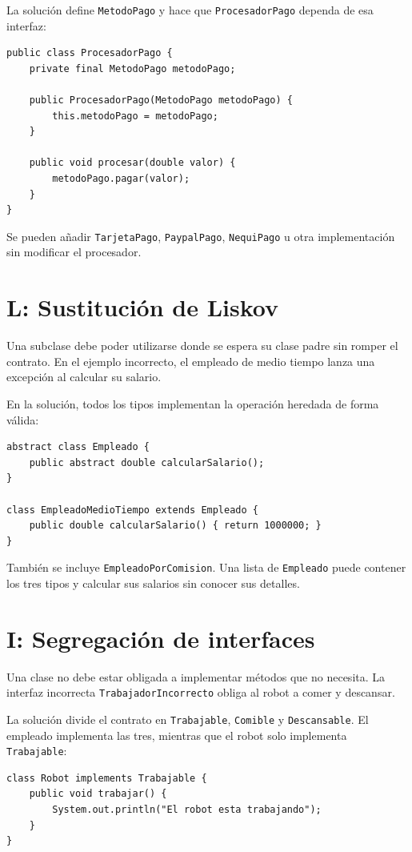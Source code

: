\documentclass[12pt,a4paper]{article}
\begin{document}
La solución define \texttt{MetodoPago} y hace que \texttt{ProcesadorPago}
dependa de esa interfaz:

\begin{lstlisting}
public class ProcesadorPago {
    private final MetodoPago metodoPago;

    public ProcesadorPago(MetodoPago metodoPago) {
        this.metodoPago = metodoPago;
    }

    public void procesar(double valor) {
        metodoPago.pagar(valor);
    }
}
\end{lstlisting}

Se pueden añadir \texttt{TarjetaPago}, \texttt{PaypalPago}, \texttt{NequiPago}
u otra implementación sin modificar el procesador.

\section{L: Sustitución de Liskov}
Una subclase debe poder utilizarse donde se espera su clase padre sin romper el
contrato. En el ejemplo incorrecto, el empleado de medio tiempo lanza una
excepción al calcular su salario.

En la solución, todos los tipos implementan la operación heredada de forma
válida:

\begin{lstlisting}
abstract class Empleado {
    public abstract double calcularSalario();
}

class EmpleadoMedioTiempo extends Empleado {
    public double calcularSalario() { return 1000000; }
}
\end{lstlisting}

También se incluye \texttt{EmpleadoPorComision}. Una lista de
\texttt{Empleado} puede contener los tres tipos y calcular sus salarios sin
conocer sus detalles.

\section{I: Segregación de interfaces}
Una clase no debe estar obligada a implementar métodos que no necesita. La
interfaz incorrecta \texttt{TrabajadorIncorrecto} obliga al robot a comer y
descansar.

La solución divide el contrato en \texttt{Trabajable}, \texttt{Comible} y
\texttt{Descansable}. El empleado implementa las tres, mientras que el robot
solo implementa \texttt{Trabajable}:

\begin{lstlisting}
class Robot implements Trabajable {
    public void trabajar() {
        System.out.println("El robot esta trabajando");
    }
}
\end{lstlisting}
\end{document}
